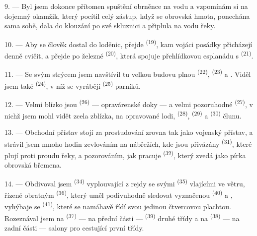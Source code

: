 9. --- Byl jsem dokonce přítomen spuštění obrněnce na vodu a vzpomínám si na dojemný okamžik,
který pocítil celý zástup, když se obrovská hmota, ponechána sama sobě, dala do klouzání po
své skluznici a připlula na vodu řeky.

10. --- Aby se člověk dostal do loděnic, přejde  \textsuperscript{(19)}, kam
vojáci posádky přicházejí denně cvičit, a přejde po železné 
\textsuperscript{(20)}, která spojuje přehlídkovou esplanádu s
 \textsuperscript{(21)}.

\VUsaut{3.0mm}
\VUsaut{3.0mm}

11. --- Se svým strýcem jsem navštívil tu velkou budovu plnou 
\textsuperscript{(22)},  \textsuperscript{(23)} a . Viděl jsem
také  \textsuperscript{(24)}, v níž se vyrábějí
 \textsuperscript{(25)} parníků.

12. --- Velmi blízko jsou  \textsuperscript{(26)} --- opravárenské doky --- a
velmi pozoruhodné  \textsuperscript{(27)}, v nichž jsem mohl vidět zcela
zblízka, na opravované lodi,  \textsuperscript{(28)}, 
\textsuperscript{(29)} a  \textsuperscript{(30)} člunu.

13. --- Obchodní přístav stojí za prostudování zrovna tak jako vojenský přístav, a strávil
jsem mnoho hodin zevlováním na nábřežích, kde jsou přivázány 
\textsuperscript{(31)}, které plují proti proudu řeky, a pozorováním, jak pracuje
 \textsuperscript{(32)}, který zvedá jako pírka obrovská břemena.

\VUsaut{3.0mm}
\VUsaut{3.0mm}

14. --- Obdivoval jsem  \textsuperscript{(34)} vyplouvající z rejdy
se svými  \textsuperscript{(35)} vlajícími ve větru, řízené obratným
 \textsuperscript{(36)}, který uměl podivuhodně sledovat
 vyznačenou  \textsuperscript{(40)} a
, vyhýbaje se  \textsuperscript{(41)},
které se namáhavě řídí svou jedinou čtvercovou plachtou. Rozeznával jsem na
 \textsuperscript{(37)} --- na přední části --- 
\textsuperscript{(39)} druhé třídy a na  \textsuperscript{(38)} --- na zadní
části --- salony pro cestující první třídy.

